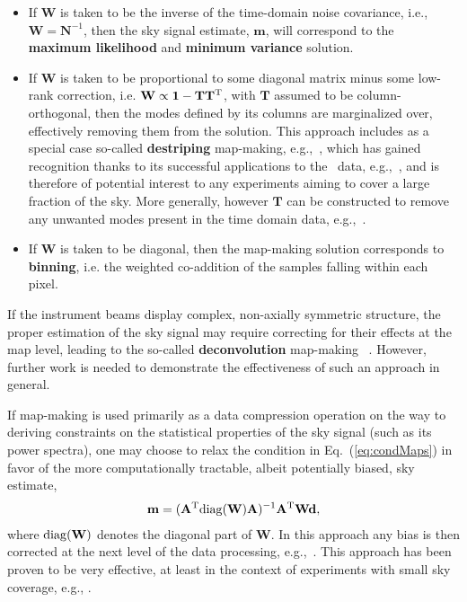 \begin{itemize}
\item If $\mathbf{W}$ is taken to be the inverse of the time-domain noise covariance, i.e., $\mathbf{W} = \mathbf{N}^{-1}$, then the sky signal estimate, $\mathbf{m}$, will correspond to the {\bf maximum likelihood} and {\bf minimum variance} solution. 
\item If $\mathbf{W}$ is taken to be proportional to some diagonal matrix minus some low-rank correction, i.e. $\mathbf{W} \propto \mathbf{1} - \mathbf{T}\mathbf{T}^{\rm T}$,  with $\mathbf{T}$ assumed to be column-orthogonal, then the modes defined by its columns are marginalized over, effectively removing them from the solution. This approach includes as a special case so-called {\bf destriping} map-making, e.g.,~\cite{Poutanen:2004hy, Keihanen:2003pu}, which has gained recognition thanks to its successful applications to the \planck\ data, e.g.,~\cite{Keihanen:2009tj, Tristram:2011gq, Ade:2015uua, Adam:2015vua}, and is therefore of potential interest to any experiments aiming to cover a large fraction of the sky. More generally, however $\mathbf{T}$ can be constructed to remove any unwanted modes present in the time domain data, e.g.,~\cite{Stompor:2002jy, Cantalupo:2009if, Dunner:2012vp}.
\item If $\mathbf{W}$ is taken to be diagonal, then the map-making solution corresponds to {\bf binning}, i.e. the weighted co-addition of the samples falling within each pixel.
\end{itemize}
If the instrument beams display complex, non-axially symmetric structure, the proper estimation of the sky signal may require correcting for their effects at the map level, leading to the so-called {\bf deconvolution} map-making ~\cite{Armitage:2004pk, Harrison:2011xt, Keihanen:2012rm}.  However, further work is needed to demonstrate the effectiveness of such an approach in general.

If map-making is used primarily as a data compression operation on the way to deriving constraints on the statistical properties of the sky signal (such as its power spectra), one may choose to relax the condition in Eq.~(\ref{eq:condMaps}) in favor of the more computationally tractable, albeit potentially biased, sky estimate,
\begin{eqnarray}
\mathbf{m} = (\mathbf{A}^{\rm T} {\rm diag}( \mathbf{W}) \mathbf{A})^{-1} \mathbf{A}^{\rm T}\mathbf{W} \mathbf{d},
\end{eqnarray}
where ${\rm diag}( \mathbf{W})$ denotes the diagonal part of $\mathbf{W}$. In this approach any bias is then corrected at the next level of the data processing, e.g.,~\cite{Hivon:2001jp}. This approach has been proven to be very effective, at least in the context of experiments with small sky coverage, e.g., \cite{Culverhouse:2010ya, Schaffer:2011mz, Ade:2014afa, Ade:2014xna}.

